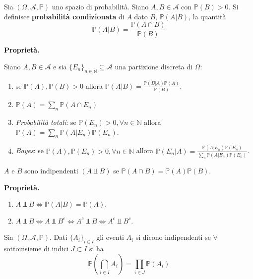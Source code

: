 
\ParteEsercizi


\begin{definition}
Sia $( \Omega ,\mathcal{A} ,\mathbb{P})$ uno spazio di probabilità. Siano $A,B\in \mathcal{A}$ con $\mathbb{P}( B)  >0$. Si definisce \textbf{probabilità condizionata} di $A$ dato $B$, $\mathbb{P}( A|B)$, la quantità
\begin{equation*}
\mathbb{P}( A|B) =\frac{\mathbb{P}( A\cap B)}{\mathbb{P}( B)}
\end{equation*}
\end{definition}
\textbf{Proprietà.}

Siano $A,B\in \mathcal{A}$ e sia $\{E_{n}\}_{n\in \mathbb{N}} \subseteq \mathcal{A}$ una partizione discreta di $\Omega $:
\begin{enumerate}
\item se $\mathbb{P}( A) ,\mathbb{P}( B)  >0$ allora $\mathbb{P}( A|B) =\frac{\mathbb{P}( B|A)\mathbb{P}( A)}{\mathbb{P}( B)}$.
\item $\mathbb{P}( A) =\sum\limits _{n}\mathbb{P}( A\cap E_{n})$
\item \textit{Probabilità totali}: se $\mathbb{P}( E_{n})  >0,\forall n\in \mathbb{N}$ allora $\mathbb{P}( A) =\sum\limits _{n}\mathbb{P}( A|E_{n})\mathbb{P}( E_{n})$.
\item \textit{Bayes}: se $\mathbb{P}( A) ,\mathbb{P}( E_{n})  >0,\forall n\in \mathbb{N}$ allora $\mathbb{P}( E_{n} |A) =\frac{\mathbb{P}( A|E_{n})\mathbb{P}( E_{n})}{\sum\limits _{n}\mathbb{P}( A|E_{n})\mathbb{P}( E_{n})}$.
\end{enumerate}
\begin{definition}
$A$ e $B$ sono indipendenti $( A\Bot B)$ se $\mathbb{P}( A\cap B) =\mathbb{P}( A)\mathbb{P}( B)$.
\end{definition}
\textbf{Proprietà.}
\begin{enumerate}
\item $A\Bot B\iff \mathbb{P}( A|B) =\mathbb{P}( A)$.
\item $A\Bot B\iff A\Bot B^{c} \iff A^{c} \Bot B\iff A^{c} \Bot B^{c}$.
\end{enumerate}
\begin{definition}
Sia $( \Omega ,\mathcal{A} ,\mathbb{P})$. Dati $\{A_{i}\}_{i\in I}$ gli eventi $A_{i}$ si dicono indipendenti se $\forall $ sottoinsieme di indici $J\subset I$ si ha
\begin{equation*}
\mathbb{P}\left(\bigcap _{i\in I} A_{i}\right) =\prod _{i\in J}\mathbb{P}( A_{i})
\end{equation*}
\end{definition}
